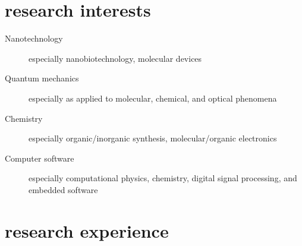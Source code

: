 \documentclass[overlapped,line,10pt,letterpaper]{res}
\begin{document}
\begin{resume}
\section{research interests}
\begin{description}
\item[Nanotechnology] especially nanobiotechnology, molecular devices
\item[Quantum mechanics] especially as applied to molecular, chemical, and optical phenomena
\item[Chemistry] especially organic/inorganic synthesis, molecular/organic electronics
\item[Computer software] especially computational physics, chemistry, digital signal processing, and embedded software
\end{description}

\section{research experience}


\end{resume}
\end{document}
